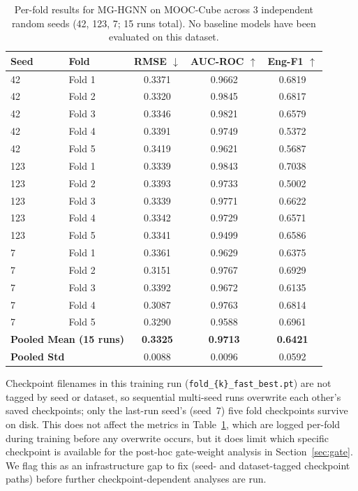 \documentclass[sigconf,review]{acmart}
\begin{document}
\begin{table}[t]
\centering
\small
\caption{Per-fold results for MG-HGNN on MOOC-Cube
         across 3 independent random seeds (42, 123,
         7; 15 runs total). No baseline models have
         been evaluated on this dataset.}
\label{tab:moocc_perfold}
\begin{tabular}{llccc}
\toprule
\textbf{Seed} & \textbf{Fold}
  & \textbf{RMSE} $\downarrow$
  & \textbf{AUC-ROC} $\uparrow$
  & \textbf{Eng-F1} $\uparrow$ \\
\midrule
42  & Fold 1 & 0.3371 & 0.9662 & 0.6819 \\
42  & Fold 2 & 0.3320 & 0.9845 & 0.6817 \\
42  & Fold 3 & 0.3346 & 0.9821 & 0.6579 \\
42  & Fold 4 & 0.3391 & 0.9749 & 0.5372 \\
42  & Fold 5 & 0.3419 & 0.9621 & 0.5687 \\
\midrule
123 & Fold 1 & 0.3339 & 0.9843 & 0.7038 \\
123 & Fold 2 & 0.3393 & 0.9733 & 0.5002 \\
123 & Fold 3 & 0.3339 & 0.9771 & 0.6622 \\
123 & Fold 4 & 0.3342 & 0.9729 & 0.6571 \\
123 & Fold 5 & 0.3341 & 0.9499 & 0.6586 \\
\midrule
7   & Fold 1 & 0.3361 & 0.9629 & 0.6375 \\
7   & Fold 2 & 0.3151 & 0.9767 & 0.6929 \\
7   & Fold 3 & 0.3392 & 0.9672 & 0.6135 \\
7   & Fold 4 & 0.3087 & 0.9763 & 0.6814 \\
7   & Fold 5 & 0.3290 & 0.9588 & 0.6961 \\
\midrule
\multicolumn{2}{l}{\textbf{Pooled Mean (15 runs)}}
              & \textbf{0.3325} & \textbf{0.9713}
              & \textbf{0.6421} \\
\multicolumn{2}{l}{\textbf{Pooled Std}}
              & 0.0088          & 0.0096
              & 0.0592          \\
\bottomrule
\end{tabular}
\end{table}

Checkpoint filenames in this training run
(\texttt{fold\_\{k\}\_fast\_best.pt}) are not tagged
by seed or dataset, so sequential multi-seed runs
overwrite each other's saved checkpoints; only the
last-run seed's (seed~7) five fold checkpoints survive
on disk. This does not affect the metrics in
Table~\ref{tab:moocc_perfold}, which are logged
per-fold during training before any overwrite occurs,
but it does limit which specific checkpoint is
available for the post-hoc gate-weight analysis in
Section~\ref{sec:gate}. We flag this as an
infrastructure gap to fix (seed- and dataset-tagged
checkpoint paths) before further checkpoint-dependent
analyses are run.
\end{document}

